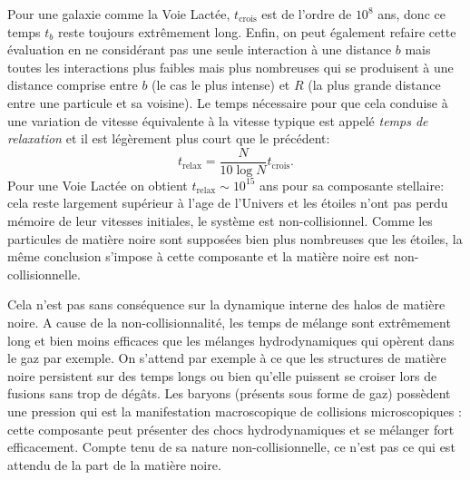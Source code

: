 Pour une galaxie comme la Voie Lactée, $t_\mathrm{crois}$ est de l'ordre de $10^8$ ans, donc ce temps $t_b$ reste toujours extrêmement long. Enfin, on peut également refaire cette évaluation en ne considérant pas une seule interaction à une distance $b$ mais toutes les interactions plus faibles mais plus nombreuses qui se produisent à une distance comprise entre $b$ (le cas le plus intense) et $R$ (la plus grande distance entre une particule et sa voisine). Le temps nécessaire pour que cela conduise à une variation de vitesse équivalente à la vitesse typique est appelé \textit{temps de relaxation} et il est légèrement plus court que le précédent:
\begin{equation}
t_\mathrm{relax}=\frac{N}{10\log N} t_\mathrm{crois}.
\end{equation}
Pour une Voie Lactée on obtient $t_\mathrm{relax} \sim 10^{15}$ ans pour sa composante stellaire: cela reste largement supérieur à l'age de l'Univers et les étoiles n'ont pas perdu mémoire de leur vitesses initiales, le système est non-collisionnel. Comme les particules de matière noire sont supposées bien plus nombreuses que les étoiles, la même conclusion s'impose à cette composante et la matière noire est non-collisionnelle.

Cela n'est pas sans conséquence sur la dynamique interne des halos de matière noire. A cause de la non-collisionnalité, les temps de mélange sont extrêmement long et bien moins efficaces que les mélanges hydrodynamiques qui opèrent dans le gaz par exemple. On s'attend par exemple à ce que les structures de matière noire persistent sur des temps longs ou bien qu'elle puissent se croiser lors de fusions sans trop de dégâts. Les baryons (présents sous forme de gaz) possèdent une pression qui est la manifestation macroscopique de collisions microscopiques : cette composante peut présenter des chocs hydrodynamiques et se mélanger fort efficacement. Compte tenu de sa nature non-collisionnelle, ce n'est pas ce qui est attendu de la part de la matière noire.


